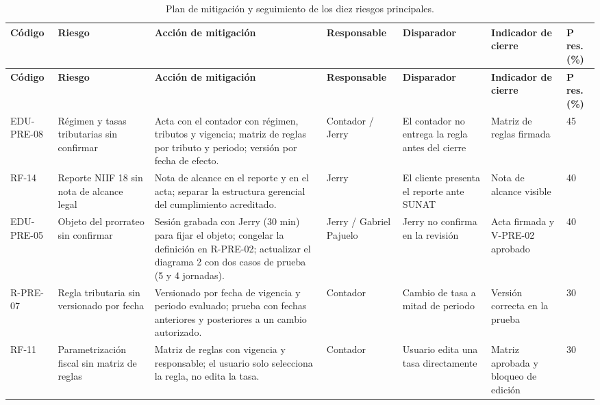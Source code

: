 \begin{landscape}
{\footnotesize\setlength{\tabcolsep}{3pt}\renewcommand{\arraystretch}{1.1}
\begin{longtable}{L{2.4cm} L{3.0cm} L{5.5cm} L{2.3cm} L{3.3cm} L{3.5cm} R{1.6cm}}
\caption{Plan de mitigación y seguimiento de los diez riesgos principales.}
\label{tab:riesgos-plan}\\
\toprule
\textbf{Código} & \textbf{Riesgo} & \textbf{Acción de mitigación} & \textbf{Responsable} & \textbf{Disparador} & \textbf{Indicador de cierre} & \textbf{P res. (\%)} \\
\midrule
\endfirsthead
\toprule
\textbf{Código} & \textbf{Riesgo} & \textbf{Acción de mitigación} & \textbf{Responsable} & \textbf{Disparador} & \textbf{Indicador de cierre} & \textbf{P res. (\%)} \\
\midrule
\endhead
\bottomrule
\endfoot
EDU-PRE-08 & Régimen y tasas tributarias sin confirmar & Acta con el contador con régimen, tributos y vigencia; matriz de reglas por tributo y periodo; versión por fecha de efecto. & Contador / Jerry & El contador no entrega la regla antes del cierre & Matriz de reglas firmada & 45 \\
RF-14 & Reporte NIIF 18 sin nota de alcance legal & Nota de alcance en el reporte y en el acta; separar la estructura gerencial del cumplimiento acreditado. & Jerry & El cliente presenta el reporte ante SUNAT & Nota de alcance visible & 40 \\
EDU-PRE-05 & Objeto del prorrateo sin confirmar & Sesión grabada con Jerry (30 min) para fijar el objeto; congelar la definición en R-PRE-02; actualizar el diagrama 2 con dos casos de prueba (5 y 4 jornadas). & Jerry / Gabriel Pajuelo & Jerry no confirma en la revisión & Acta firmada y V-PRE-02 aprobado & 40 \\
R-PRE-07 & Regla tributaria sin versionado por fecha & Versionado por fecha de vigencia y periodo evaluado; prueba con fechas anteriores y posteriores a un cambio autorizado. & Contador & Cambio de tasa a mitad de periodo & Versión correcta en la prueba & 30 \\
RF-11 & Parametrización fiscal sin matriz de reglas & Matriz de reglas con vigencia y responsable; el usuario solo selecciona la regla, no edita la tasa. & Contador & Usuario edita una tasa directamente & Matriz aprobada y bloqueo de edición & 30 \\

\end{longtable}}
\end{landscape}
